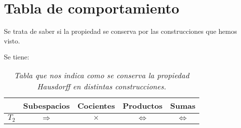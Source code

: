 \section{Tabla de comportamiento}%
\label{sec:tabla_de_comportamiento}
Se trata de saber si la propiedad se conserva por las construcciones que hemos visto.

Se tiene:
\begin{table}[H]
\centering
\begin{tabular}{| c | c | c | c | c |}
    \hline
    & Subespacios & Cocientes & Productos & Sumas\\
    \hline
    $T_2$ & $\Rightarrow$ & $\times$ & $\Leftrightarrow$ & $\Leftrightarrow$\\
    \hline
\end{tabular}
\caption{\textit{Tabla que nos indica como se conserva la propiedad Hausdorff en distintas construcciones.}}
\end{table}
